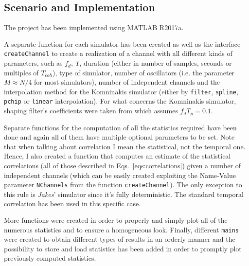 \subsection{Scenario and Implementation} %
\label{subsec:scenario}

The project has been implemented using MATLAB\textsuperscript{\textregistered} R2017a.

A separate function for each simulator has been created as well as the interface \texttt{createChannel} to create a realization of a channel with all different kinds of parameters, such as $f_d,\ T$, duration (either in number of samples, seconds or multiples of $T_{coh}$), type of simulator, number of oscillators (i.e. the parameter $M \approx N/4$ for most simulators), number of independent channels and the interpolation method for the Komninakis simulator (either by \texttt{filter}, \texttt{spline}, \texttt{pchip} or \texttt{linear} interpolation). For what concerns the Komninakis simulator, shaping filter's coefficients were taken from \cite[p.~317]{digital} which assumes $f_dT_p=0.1$.

Separate functions for the computation of all the statistics required have been done and again all of them have multiple optional parameters to be set. Note that when talking about correlation I mean the statistical, not the temporal one. Hence, I also created a function that computes an estimate of the statistical correlations (all of those described in Eqs.~\ref{eqs:correlations}) given a number of independent channels (which can be easily created exploiting the Name-Value parameter \texttt{NChannels} from the function \texttt{createChannel}). The only exception to this rule is \textit{Jakes}' simulator since it's fully deterministic. The standard temporal correlation has been used in this specific case.

More functions were created in order to properly and simply plot all of the numerous statistics and to ensure a homogeneous look. Finally, different \texttt{mains} were created to obtain different types of results in an orderly manner and the possibility to store and load statistics has been added in order to promptly plot previously computed statistics.